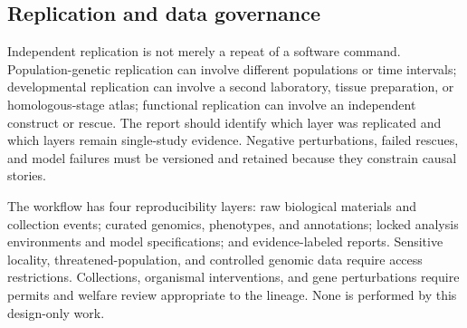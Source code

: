\documentclass[conference]{IEEEtran}
\begin{document}
\subsection{Replication and data governance}

Independent replication is not merely a repeat of a software command. Population-genetic replication can involve different populations or time intervals; developmental replication can involve a second laboratory, tissue preparation, or homologous-stage atlas; functional replication can involve an independent construct or rescue. The report should identify which layer was replicated and which layers remain single-study evidence. Negative perturbations, failed rescues, and model failures must be versioned and retained because they constrain causal stories.

The workflow has four reproducibility layers: raw biological materials and collection events; curated genomics, phenotypes, and annotations; locked analysis environments and model specifications; and evidence-labeled reports. Sensitive locality, threatened-population, and controlled genomic data require access restrictions. Collections, organismal interventions, and gene perturbations require permits and welfare review appropriate to the lineage. None is performed by this design-only work.
\end{document}
